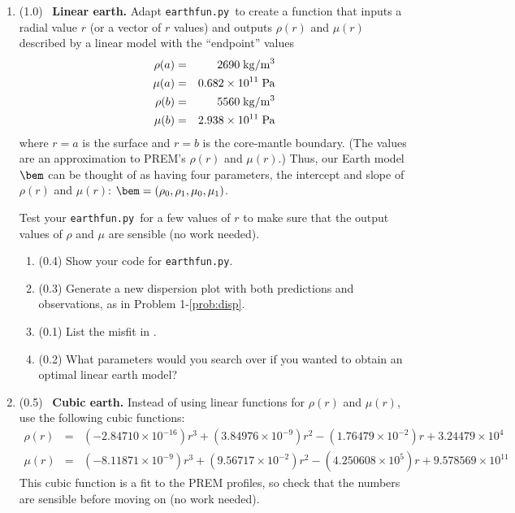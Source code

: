 \documentclass[11pt,titlepage,fleqn]{article}
\newcommand{\tfileD}{{\tt earthfun.py}}
\begin{document}
\begin{enumerate}
\label{prob:earth_homo}


\item (1.0) \ptag\ {\bf Linear earth.} Adapt \tfileD\ to create a function that inputs a radial value $r$ (or a vector of $r$ values) and outputs $\rho(r)$ and $\mu(r)$ described by a linear model with the ``endpoint'' values
%
\begin{eqnarray*}
\rho(a) &=& 2690 \; {\rm kg/m^3}
\\
\mu(a) &=& 0.682 \times 10^{11} \; {\rm Pa}
\\
\rho(b) &=& 5560 \; {\rm kg/m^3}
\\
\mu(b) &=& 2.938 \times 10^{11} \; {\rm Pa}
\end{eqnarray*}
%
where $r=a$ is the surface and $r=b$ is the core-mantle boundary. (The values are an approximation to PREM's $\rho(r)$ and $\mu(r)$.) Thus, our Earth model $\bem$ can be thought of as having four parameters, the intercept and slope of $\rho(r)$ and $\mu(r)$: $\bem = (\rho_0,\rho_1,\mu_0,\mu_1)$.

Test your \tfileD\ for a few values of $r$ to make sure that the output values of $\rho$ and $\mu$ are sensible (no work needed).


\begin{enumerate}
\item (0.4) Show your code for \tfileD.
\item (0.3) Generate a new dispersion plot with both predictions and observations, as in Problem 1-\ref{prob:disp}.
\item (0.1) List the misfit in .
\item (0.2) What parameters would you search over if you wanted to obtain an optimal linear earth model?
\end{enumerate}

\label{prob:earth_linear}


\item (0.5) \ptag\ {\bf Cubic earth.} Instead of using linear functions for $\rho(r)$ and $\mu(r)$, use the following cubic functions:
%
\begin{eqnarray*}
\rho(r) &=& (-2.84710 \times 10^{-16})r^3 + (3.84976 \times 10^{-9})r^2 - (1.76479 \times 10^{-2})r + 3.24479 \times 10^{4}
\\
\mu(r) &=& (-8.11871 \times 10^{-9}) r^3 + (9.56717 \times 10^{-2})r^2 - (4.250608 \times 10^{5})r + 9.578569 \times 10^{11}
\end{eqnarray*}
%
%
This cubic function is a fit to the PREM profiles, so check that the numbers are sensible before moving on (no work needed).


\end{enumerate}
\end{document}
